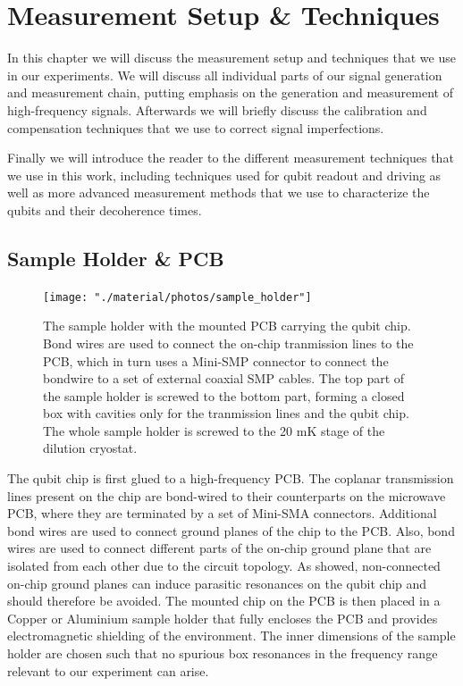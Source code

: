 \chapter{Measurement Setup \& Techniques} \label{chapter:measurement}

In this chapter we will discuss the measurement setup and techniques that we use in our experiments. We will discuss all individual parts of our signal generation and measurement chain, putting emphasis on the generation and measurement of high-frequency signals. Afterwards we will briefly discuss the calibration and compensation techniques that we use to correct signal imperfections.

Finally we will introduce the reader to the different measurement techniques that we use in this work, including techniques used for qubit readout and driving as well as more advanced measurement methods that we use to characterize the qubits and their decoherence times.

\section{Sample Holder \& PCB}

\begin{figure}
	\centering
		\texttt{[image: "./material/photos/sample\_holder"]}
	\caption[]{The sample holder with the mounted PCB carrying the qubit chip. Bond wires are used to connect the on-chip tranmission lines to the PCB, which in turn uses a Mini-SMP connector to connect the bondwire to a set of external coaxial SMP cables. The top part of the sample holder is screwed to the bottom part, forming a closed box with cavities only for the tranmission lines and the qubit chip. The whole sample holder is screwed to the 20 mK stage of the dilution cryostat.}
	\label{fig:sample_holder_and_pcb}
\end{figure}

The qubit chip is first glued to a high-frequency PCB. The coplanar transmission lines present on the chip are bond-wired to their counterparts on the microwave PCB, where they are terminated by a set of Mini-SMA connectors. Additional bond wires are used to connect ground planes of the chip to the PCB. Also, bond wires are used to connect different parts of the on-chip ground plane that are isolated from each other due to the circuit topology. As \cite{schuster_circuit_2007} showed, non-connected on-chip ground planes can induce parasitic resonances on the qubit chip and should therefore be avoided. The mounted chip on the PCB is then placed in a Copper or Aluminium sample holder that fully encloses the PCB and provides electromagnetic shielding of the environment. The inner dimensions of the sample holder are chosen such that no spurious box resonances in the frequency range relevant to our experiment can arise.

